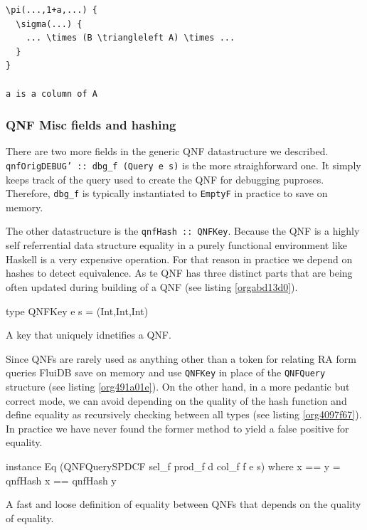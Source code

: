 \begin{verbatim}
\pi(...,1+a,...) {
  \sigma(...) {
    ... \times (B \triangleleft A) \times ...
  }
}

a is a column of A
\end{verbatim}


\subsubsection{QNF Misc fields and hashing}
\label{sec:org74a3a45}
There are two more fields in the generic QNF datastructure we
described. \texttt{qnfOrigDEBUG' :: dbg\_f (Query e s)} is the more
straighforward one. It simply keeps track of the query used to create
the QNF for debugging puproses. Therefore, \texttt{dbg\_f} is typically
instantiated to \texttt{EmptyF} in practice to save on memory.

The other datastructure is the \texttt{qnfHash :: QNFKey}. Because the QNF is
a highly self referrential data structure equality in a purely
functional environment like Haskell is a very expensive operation. For
that reason in practice we depend on hashes to detect equivalence. As
te QNF has three distinct parts that are being often updated during
building of a QNF (see listing \ref{orgabd13d0}).

\begin{listing}[p]
  \begin{haskell}
    type QNFKey e s = (Int,Int,Int)
  \end{haskell}
  \caption{\label{orgabd13d0}A key that uniquely idnetifies a QNF.}
\end{listing}

Since QNFs are rarely used as anything other than a token for relating
RA form queries FluiDB save on memory and use \texttt{QNFKey} in place of the
\texttt{QNFQuery} structure (see listing \ref{org491a01e}). On the other hand,
in a more pedantic but correct mode, we can avoid depending on the
quality of the hash function and define equality as recursively
checking between all types (see listing \ref{org4097f67}). In
practice we have never found the former method to yield a false
positive for equality.

\begin{listing}[p]
  \begin{haskell}
    instance Eq (QNFQuerySPDCF sel_f prod_f d col_f f e s) where
    x == y = qnfHash x == qnfHash y
  \end{haskell}
  \caption{\label{org491a01e}A fast and loose definition of equality between QNFs that depends on the quality of equality.}
\end{listing}


